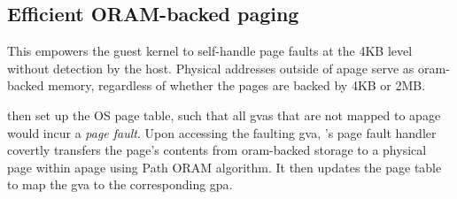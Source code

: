 \subsection{Efficient ORAM-backed paging}



This empowers the guest kernel to self-handle page faults at the 4KB level without detection by the host.
Physical addresses outside of \gls{apage} serve as \gls{oram}-backed memory, regardless of whether the pages are backed by 4KB or 2MB.

\thename then set up the OS page table, such that all \glspl{gva} that are not mapped to \gls{apage} would incur a \emph{page fault}.
Upon accessing the faulting \gls{gva}, \thename's page fault handler covertly transfers the page's contents from \gls{oram}-backed storage to a physical page within \gls{apage} using Path ORAM algorithm.
It then updates the page table to map the \gls{gva} to the corresponding \gls{gpa}.





